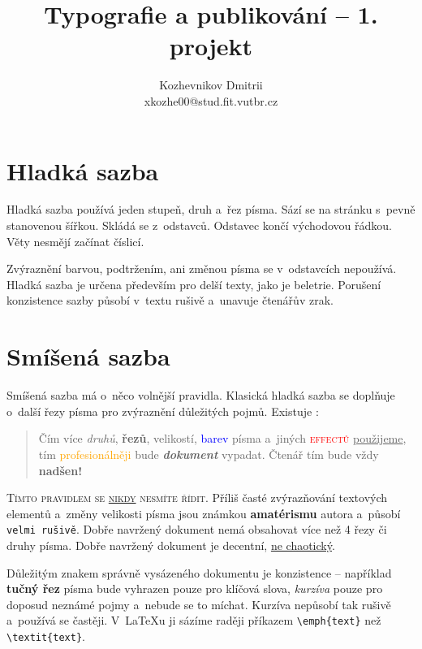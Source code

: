 \documentclass[czech,a4paper,10pt,twocolumn]{article}
\begin{document}
\title{Typografie a publikování -- 1. projekt}
\author{Kozhevnikov Dmitrii\\xkozhe00@stud.fit.vutbr.cz}
\date{}
\maketitle

\section{Hladká sazba}

Hladká sazba používá jeden stupeň, druh a~řez písma. Sází se na stránku s~pevně stanovenou šířkou. Skládá se z~odstavců. Odstavec končí východovou řádkou. Věty nesmějí začínat číslicí.

Zvýraznění barvou, podtržením, ani změnou písma se v~odstavcích nepoužívá. Hladká sazba je určena především pro delší texty, jako je beletrie. Porušení konzistence sazby působí v~textu rušivě a~unavuje čtenářův zrak.

\hypertarget{d1}{\section{Smíšená sazba}}

Smíšená sazba má o~něco volnější pravidla.
Klasická hladká sazba se doplňuje o~další řezy písma pro zvýraznění důležitých pojmů.
Existuje :

\begin{quotation}
Čím více \textit{druhů}, \textbf{řezů}, {\LARGE velikostí}, \textcolor{blue}{barev} písma a~jiných \textcolor{red}{\textsc{effectů}} \underline{použijeme}, tím \textcolor{orange}{profesionálněji}  bude {\large \textbf{\textit{dokument}}} vypadat. {\tiny Čtenář} tím bude vždy {\huge \textbf{nadšen!}}
\end{quotation}

\textsc{Tímto pravidlem se \underline {nikdy} nesmíte řídit.} Příliš časté zvýrazňování textových elementů a~změny {\tiny velikosti} písma jsou známkou \textbf{amatérismu} autora a~působí \texttt{velmi rušivě}. Dobře navržený dokument nemá obsahovat více než 4 řezy či druhy písma. Dobře navržený dokument je decentní, \underline{ne chaotický}.

Důležitým znakem správně vysázeného dokumentu je konzistence -- například \textbf{tučný řez} písma bude vyhrazen pouze pro klíčová slova, \textit{kurzíva} pouze pro doposud neznámé pojmy a~nebude se to míchat. Kurzíva nepůsobí tak rušivě a~používá se častěji. V~\LaTeX u ji sázíme raději příkazem \verb|\emph{text}| než \verb|\textit{text}|.
\end{document}
